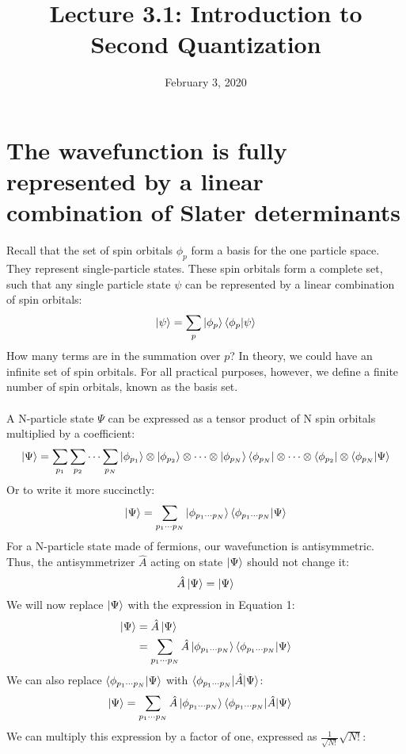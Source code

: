 \documentclass{article}
\title{Lecture 3.1: Introduction to Second Quantization}
\date{February 3, 2020}
\begin{document}
\maketitle
\noindent
\section{The wavefunction is fully represented by a linear combination of Slater determinants}
Recall that the set of spin orbitals ${\phi_p}$ form a basis for the one particle space.
They represent single-particle states.
These spin orbitals form a complete set, such that any single particle state $\psi$ can be represented by
a linear combination of spin orbitals:
\[\ket{\psi} = \sum_p \ket{\phi_p}\braket{\phi_p | \psi} \]
How many terms are in the summation over $p$? 
In theory, we could have an infinite set of spin orbitals.
For all practical purposes, however, we define a finite number of spin orbitals, known as the basis set. \\
\\
A N-particle state $\Psi$ can be expressed as a tensor product of N spin orbitals multiplied by a coefficient:
\[\ket{\Psi} = \sum_{p_1}\sum_{p_2}\cdots\sum_{p_N} \ket{\phi_{p_1}}\otimes \ket{\phi_{p_2}} \otimes \cdots \otimes \ket{\phi_{p_N}}  \bra{\phi_{p_N}}\otimes \cdots \otimes \bra{\phi_{p_2}} \otimes \braket{\phi_{p_N}  | \Psi} \]
Or to write it more succinctly: 
\begin{equation}
\ket{\Psi} = \sum_{p_1 \cdots p_N} \ket{\phi_{p_1 \cdots p_N}} \braket{\phi_{p_1 \cdots p_N} | \Psi} 
\end{equation}
For a N-particle state made of fermions, our wavefunction is antisymmetric.
Thus, the antisymmetrizer $\hat{A}$ acting on state $\ket{\Psi}$ should not change it: 
\[ \hat{A}\ket{\Psi} = \ket{\Psi} \]
We will now replace $\ket{\Psi}$ with the expression in Equation 1: 
\begin{align*}
\ket{\Psi} &=  \hat{A} \ket{\Psi}\\
&=\sum_{p_1 \cdots p_N}\hat{A} \ket{\phi_{p_1 \cdots p_N}} \braket{\phi_{p_1 \cdots p_N} | \Psi}  
\end{align*}
We can also replace $\braket{\phi_{p_1 \cdots p_N} | \Psi}$ with $\braket{\phi_{p_1 \cdots p_N} | \hat{A} | \Psi} $: 
\begin{align*}
\ket{\Psi} &=\sum_{p_1 \cdots p_N}\hat{A} \ket{\phi_{p_1 \cdots p_N}} \braket{\phi_{p_1 \cdots p_N} | \hat{A} | \Psi} 
\end{align*}
We can multiply this expression by a factor of one, expressed as $\frac{1}{\sqrt{N!}} \sqrt{N!}$: 
\end{document}
